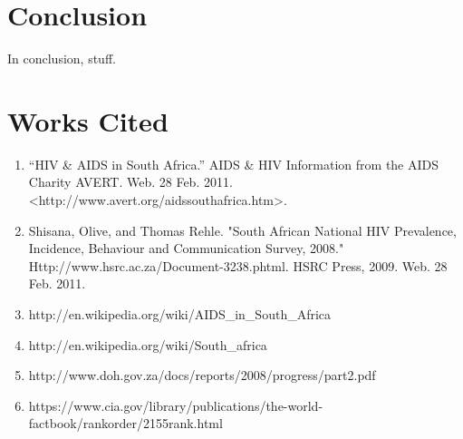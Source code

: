 \documentclass[12pt]{article}
\begin{document}
\section{Conclusion}
In conclusion, stuff.

\section{Works Cited}
\begin{enumerate}

\item ``HIV \& AIDS in South Africa.'' AIDS \& HIV Information from the AIDS Charity AVERT. Web. 28 Feb. 2011. <http://www.avert.org/aidssouthafrica.htm>.
\item Shisana, Olive, and Thomas Rehle. "South African National HIV Prevalence, Incidence, Behaviour and Communication Survey, 2008." Http://www.hsrc.ac.za/Document-3238.phtml. HSRC Press, 2009. Web. 28 Feb. 2011.
\item http://en.wikipedia.org/wiki/AIDS\_in\_South\_Africa
\item http://en.wikipedia.org/wiki/South\_africa
\item http://www.doh.gov.za/docs/reports/2008/progress/part2.pdf
\item https://www.cia.gov/library/publications/the-world-factbook/rankorder/2155rank.html

\end{enumerate}
\end{document}
